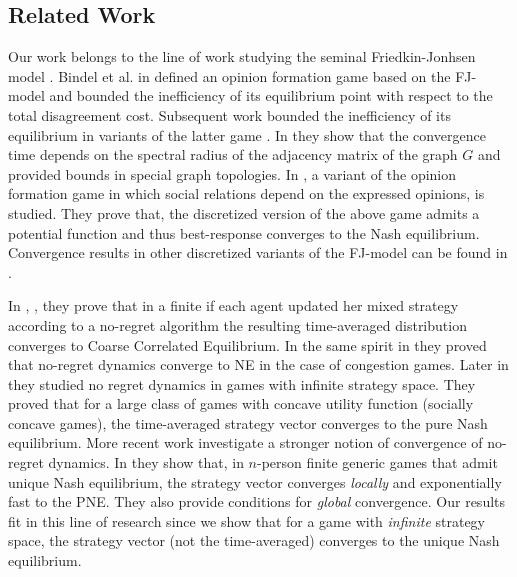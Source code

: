 \subsection{Related Work}
Our work belongs to the line of work studying the seminal Friedkin-Jonhsen
model \cite{FJ90}. Bindel et al. in \cite{BKO11} defined an opinion
formation game based on the FJ-model and bounded the inefficiency
of its equilibrium point with respect to the total disagreement cost.
Subsequent work bounded the inefficiency of its equilibrium in variants
of the latter game \cite{BGM13, EFHS17, CKO13, BFM16}.
In \cite{GS14} they show that the convergence time depends on
the spectral radius of the adjacency matrix of the graph $G$
and provided bounds in special graph topologies.
In \cite{BFM16}, a variant of the opinion formation game in which social
relations depend on the expressed opinions, is studied.
They prove that, the discretized version of the above game admits
a potential function and thus best-response converges to the
Nash equilibrium. Convergence results in other discretized variants of
the FJ-model can be found in \cite{YOASS13, FGV16}.


In \cite{FV97}, \cite{FS99}, \cite{HM00} they prove that in a finite
if each agent updated her mixed strategy according to a no-regret
algorithm the resulting time-averaged distribution converges to
Coarse Correlated Equilibrium. In the same spirit in \cite{BEL06}
they proved that no-regret dynamics converge to NE in the
case of congestion games. Later in \cite{EMN09} they studied no regret
dynamics in games with infinite strategy space. They proved that for a large
class of games with concave utility function (socially concave games), the
time-averaged strategy vector converges to the pure Nash equilibrium.
More recent work investigate a stronger notion of convergence of
no-regret dynamics. In \cite{CHM17} they show that,
in $n$-person finite generic games that admit unique Nash equilibrium,
the strategy vector converges \emph{locally} and exponentially fast
to the PNE. They also provide conditions for \emph{global} convergence.
Our results fit in this line of research since we show that
for a game with \emph{infinite} strategy space, the strategy vector (not the
time-averaged) converges to the unique Nash equilibrium.

